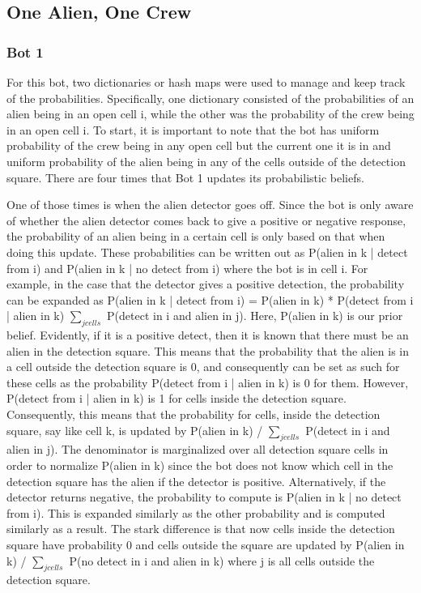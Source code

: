 \documentclass[11pt]{article}
\begin{document}
\subsection{One Alien, One Crew}

\subsubsection{Bot 1}
For this bot, two dictionaries or hash maps were used to manage and keep track of the probabilities. Specifically, one dictionary consisted of the probabilities of an alien being in an open cell i, while the other was the probability of the crew being in an open cell i. To start, it is important to note that the bot has uniform probability of the crew being in any open cell but the current one it is in and uniform probability of the alien being in any of the cells outside of the detection square. There are four times that Bot 1 updates its probabilistic beliefs.
\medskip

One of those times is when the alien detector goes off. Since the bot is only aware of whether the alien detector comes back to give a positive or negative response, the probability of an alien being in a certain cell is only based on that when doing this update. These probabilities can be written out as P(alien in k | detect from i) and P(alien in k | no detect from i) where the bot is in cell i. For example, in the case that the detector gives a positive detection, the probability can be expanded as P(alien in k | detect from i) = P(alien in k) * P(detect from i | alien in k) $\sum_{j cells}$ P(detect in i and alien in j). Here, P(alien in k) is our prior belief. Evidently, if it is a positive detect, then it is known that there must be an alien in the detection square. This means that the probability that the alien is in a cell outside the detection square is 0, and consequently can be set as such for these cells as the probability P(detect from i | alien in k) is 0 for them. However, P(detect from i | alien in k) is 1 for cells inside the detection square. Consequently, this means that the probability for cells, inside the detection square, say like cell k, is updated by P(alien in k) / $\sum_{j cells}$ P(detect in i and alien in j). The denominator is marginalized over all detection square cells in order to normalize P(alien in k) since the bot does not know which cell in the detection square has the alien if the detector is positive. Alternatively, if the detector returns negative, the probability to compute is P(alien in k | no detect from i). This is expanded similarly as the other probability and is computed similarly as a result. The stark difference is that now cells inside the detection square have probability 0 and cells outside the square are updated by P(alien in k) / $\sum_{j cells}$ P(no detect in i and alien in k) where j is all cells outside the detection square.   
\end{document}
